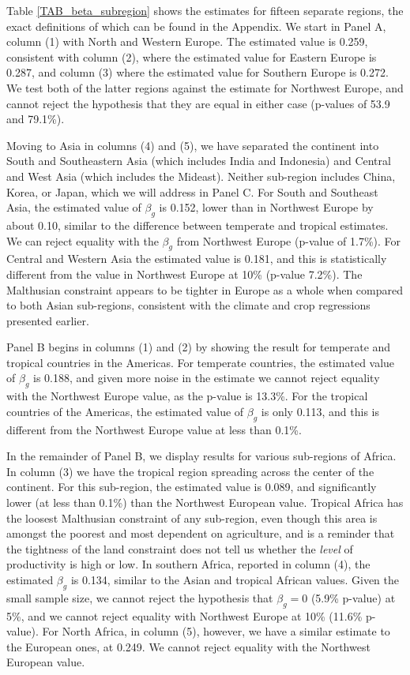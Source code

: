 \documentclass[11pt]{article}
\begin{document}
Table \ref{TAB_beta_subregion} shows the estimates for fifteen separate regions, the exact definitions of which can be found in the Appendix. We start in Panel A, column (1) with North and Western Europe. The estimated value is 0.259, consistent with column (2), where the estimated value for Eastern Europe is 0.287, and column (3) where the estimated value for Southern Europe is 0.272. We test both of the latter regions against the estimate for Northwest Europe, and cannot reject the hypothesis that they are equal in either case (p-values of 53.9 and 79.1\%). 

Moving to Asia in columns (4) and (5), we have separated the continent into South and Southeastern Asia (which includes India and Indonesia) and Central and West Asia (which includes the Mideast). Neither sub-region includes China, Korea, or Japan, which we will address in Panel C. For South and Southeast Asia, the estimated value of $\beta_g$ is 0.152, lower than in Northwest Europe by about 0.10, similar to the difference between temperate and tropical estimates. We can reject equality with the $\beta_g$ from Northwest Europe (p-value of 1.7\%). For Central and Western Asia the estimated value is 0.181, and this is statistically different from the value in Northwest Europe at 10\% (p-value 7.2\%). The Malthusian constraint appears to be tighter in Europe as a whole when compared to both Asian sub-regions, consistent with the climate and crop regressions presented earlier.

Panel B begins in columns (1) and (2) by showing the result for temperate and tropical countries in the Americas. For temperate countries, the estimated value of $\beta_g$ is 0.188, and given more noise in the estimate we cannot reject equality with the Northwest Europe value, as the p-value is 13.3\%. For the tropical countries of the Americas, the estimated value of $\beta_g$ is only 0.113, and this is different from the Northwest Europe value at less than 0.1\%.

In the remainder of Panel B, we display results for various sub-regions of Africa. In column (3) we have the tropical region spreading across the center of the continent. For this sub-region, the estimated value is 0.089, and significantly lower (at less than 0.1\%) than the Northwest European value. Tropical Africa has the loosest Malthusian constraint of any sub-region, even though this area is amongst the poorest and most dependent on agriculture, and is a reminder that the tightness of the land constraint does not tell us whether the \textit{level} of productivity is high or low. In southern Africa, reported in column (4), the estimated $\beta_g$ is 0.134, similar to the Asian and tropical African values. Given the small sample size, we cannot reject the hypothesis that $\beta_g=0$ (5.9\% p-value) at 5\%, and we cannot reject equality with Northwest Europe at 10\% (11.6\% p-value). For North Africa, in column (5), however, we have a similar estimate to the European ones, at 0.249. We cannot reject equality with the Northwest European value.
\end{document}
